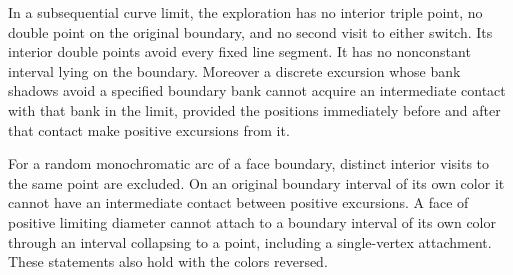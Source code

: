 \begin{lemma}
\label{lem:exploration-contacts}
In a subsequential curve limit, the exploration has no interior triple
point, no double point on the original boundary, and no second visit
to either switch.  Its interior double points avoid every fixed line
segment.  It has no nonconstant interval lying on the boundary.
Moreover a discrete excursion whose bank shadows avoid a specified
boundary bank cannot acquire an intermediate contact with that bank
in the limit, provided the positions immediately before and after that
contact make positive excursions from it.

For a random monochromatic arc of a face boundary, distinct interior
visits to the same point are excluded.  On an original boundary
interval of its own color it cannot have an intermediate contact
between positive excursions.  A face of positive limiting diameter
cannot attach to a boundary interval of its own color through an
interval collapsing to a point, including a single-vertex attachment.
These statements also hold with the colors reversed.
\end{lemma}

